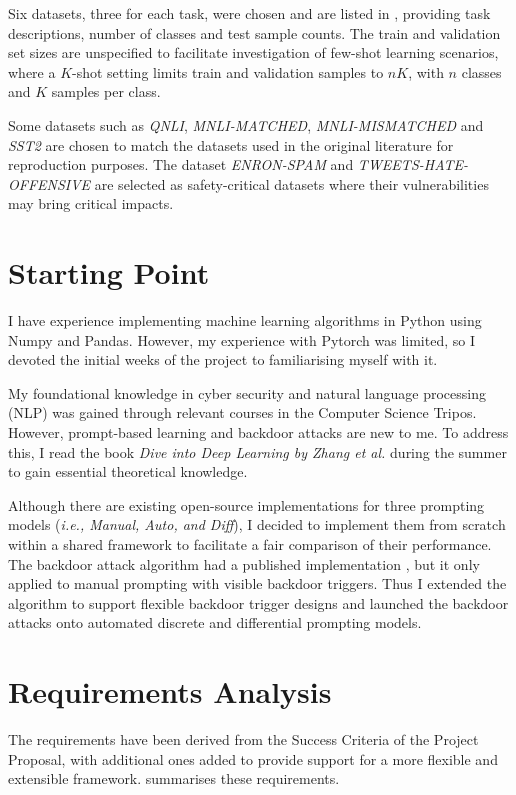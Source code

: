 Six datasets, three for each task, were chosen and are listed in , providing task descriptions, number of classes and test sample counts. The train and validation set sizes are unspecified to facilitate investigation of few-shot learning scenarios, where a $K$-shot setting limits train and validation samples to $nK$, with $n$ classes and $K$ samples per class.

Some datasets such as \textit{QNLI}, \textit{MNLI-MATCHED}, \textit{MNLI-MISMATCHED} and \textit{SST2} are chosen to match the datasets used in the original literature for reproduction purposes. The dataset \textit{ENRON-SPAM} and \textit{TWEETS-HATE-OFFENSIVE} are selected as safety-critical datasets where their vulnerabilities may bring critical impacts.


\section{Starting Point}
I have experience implementing machine learning algorithms in Python using Numpy and Pandas. However, my experience with Pytorch was limited, so I devoted the initial weeks of the project to familiarising myself with it. 

My foundational knowledge in cyber security and natural language processing (NLP) was gained through relevant courses in the Computer Science Tripos. However, prompt-based learning and backdoor attacks are new to me. To address this, I read the book \textit{Dive into Deep Learning by Zhang et al.} \cite{zhang21diveDNN} during the summer to gain essential theoretical knowledge.

Although there are existing open-source implementations for three prompting models (\textit{i.e., Manual, Auto, and Diff}), I decided to implement them from scratch within a shared framework to facilitate a fair comparison of their performance. The backdoor attack algorithm had a published implementation \cite{Lei22}, but it only applied to manual prompting with visible backdoor triggers. Thus I extended the algorithm to support flexible backdoor trigger designs and launched the backdoor attacks onto automated discrete and differential prompting models.

\section{Requirements Analysis}
The requirements have been derived from the Success Criteria of the Project Proposal, with additional ones added to provide support for a more flexible and extensible framework.  summarises these requirements.


